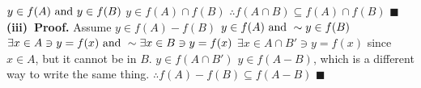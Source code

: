 \documentclass[12pt]{article}
\begin{document}
	\newline
	\(y \in f(A) \textup{ and } y \in f(B)\)
	\newline
	\(y \in f(A) \cap f(B)\)
	\newline
	\(\therefore f(A \cap B) \subseteq f(A) \cap f(B)\)
	\newline \(\blacksquare\) \newline \newline
	\textbf{(iii)\ Proof.}
	\newline
	Assume \(y \in f(A) - f(B)\)
	\newline
	\(y \in f(A) \textup{ and }\sim y \in f(B) \)
	\newline
	\(\exists x \in A \ni y = f(x)\textup{ and }\sim \exists x \in B\ni y = f(x)\)
	\newline
	\(\exists x \in A\cap B'\ni y = f(x)\) since \(x \in A\), but it cannot be in \(B\).
	\newline
	\(y \in f(A\cap B')\)
	\newline
	\(y \in f(A-B)\), which is a different way to write the same thing.
	\newline
	\(\therefore f(A)-f(B) \subseteq f(A-B)\)
	\newline \(\blacksquare\)
	\newpage
	\maketitle
\end{document}
